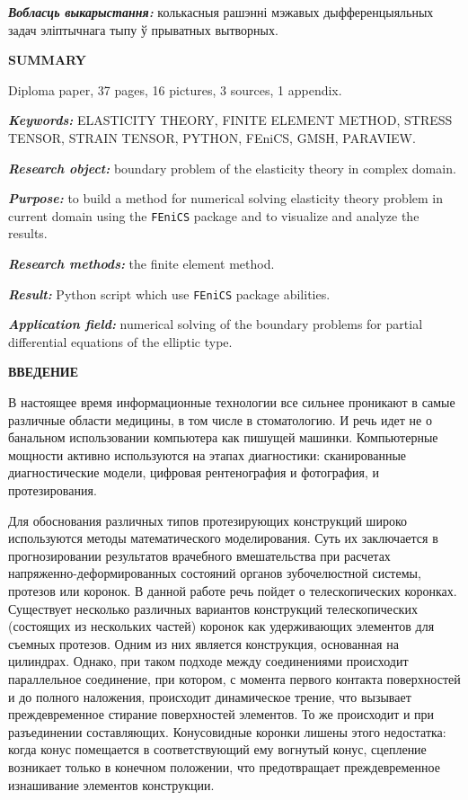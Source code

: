 \documentclass[a4paper, 14pt]{extreport}
\begin{document}
\textbf{\textit{Вобласць выкарыстання:}} колькасныя рашэнні мэжавых 
дыфференцыяльных задач эліптычнага тыпу ў прыватных вытворных.


\begin{center}
	\Large{\textbf{SUMMARY}}
\end{center}

Diploma paper, 37 pages, 16 pictures, 3 sources, 1 appendix.

\textbf{\textit{Keywords:}} ELASTICITY THEORY, FINITE ELEMENT METHOD,
STRESS TENSOR,  STRAIN TENSOR, PYTHON, FEniCS, GMSH, 
PARAVIEW.

\textbf{\textit{Research object:}} boundary problem of the elasticity
theory in complex domain.

\textbf{\textit{Purpose:}} to build a method for numerical solving 
elasticity theory problem in current domain using the \texttt{FEniCS}
package and to visualize and analyze the results.

\textbf{\textit{Research methods:}} the finite element method.

\textbf{\textit{Result:}} Python script which use \texttt{FEniCS}
package abilities.

\textbf{\textit{Application field:}} numerical solving of the
boundary problems for partial differential equations of the elliptic type.


\newpage
{}
\begin{center}
	\Large{\textbf{ВВЕДЕНИЕ}}
\end{center}

В настоящее время информационные технологии все сильнее 
проникают в самые различные области медицины, в том числе в 
стоматологию. И речь идет не о банальном использовании 
компьютера как пишущей машинки. Компьютерные 
мощности активно используются на этапах диагностики: 
сканированные диагностические модели, цифровая рентенография и фотография, и протезирования.

Для обоснования различных типов протезирующих конструкций 
широко используются методы математического моделирования.
Суть их заключается в прогнозировании результатов врачебного 
вмешательства при расчетах напряженно-деформированных 
состояний органов зубочелюстной системы, протезов или 
коронок. В данной работе речь пойдет о телескопических
коронках.
Существует несколько различных вариантов конструкций
телескопических (состоящих из нескольких частей) коронок 
как удерживающих элементов для съемных протезов.
Одним из них является конструкция, основанная на 
цилиндрах. Однако, при таком подходе между соединениями
происходит параллельное соединение, при котором, с момента 
первого контакта поверхностей и до полного наложения, 
происходит динамическое трение, что вызывает 
преждевременное стирание поверхностей элементов. То 
же происходит и при разъединении составляющих.
Конусовидные коронки лишены этого недостатка: когда конус
помещается в соответствующий ему вогнутый конус, сцепление
возникает только в конечном положении, что предотвращает 
преждевременное изнашивание элементов конструкции.
\end{document}

